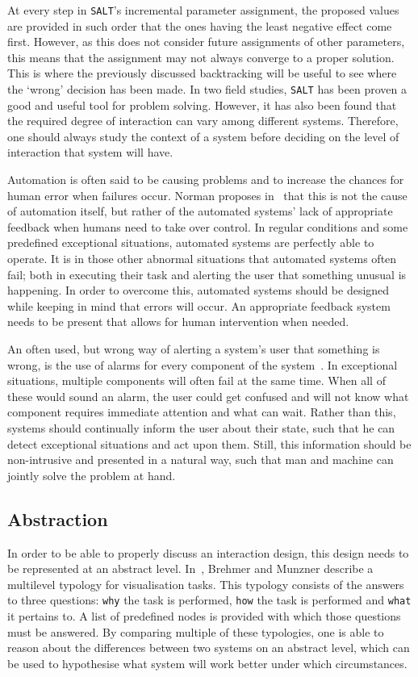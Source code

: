 At every step in \verb|SALT|'s incremental parameter assignment, the proposed values are provided in such order that the ones having the least negative effect come first. However, as this does not consider future assignments of other parameters, this means that the assignment may not always converge to a proper solution. This is where the previously discussed backtracking will be useful to see where the `wrong' decision has been made. In two field studies, \verb|SALT| has been proven a good and useful tool for problem solving. However, it has also been found that the required degree of interaction can vary among different systems. Therefore, one should always study the context of a system before deciding on the level of interaction that system will have.

Automation is often said to be causing problems and to increase the chances for human error when failures occur. Norman proposes in~\cite{norman1990problem} that this is not the cause of automation itself, but rather of the automated systems' lack of appropriate feedback when humans need to take over control. In regular conditions and some predefined exceptional situations, automated systems are perfectly able to operate. It is in those other abnormal situations that automated systems often fail; both in executing their task and alerting the user that something unusual is happening. In order to overcome this, automated systems should be designed while keeping in mind that errors will occur. An appropriate feedback system needs to be present that allows for human intervention when needed.

An often used, but wrong way of alerting a system's user that something is wrong, is the use of alarms for every component of the system~\cite{norman1990problem}. In exceptional situations, multiple components will often fail at the same time. When all of these would sound an alarm, the user could get confused and will not know what component requires immediate attention and what can wait. Rather than this, systems should continually inform the user about their state, such that he can detect exceptional situations and act upon them. Still, this information should be non-intrusive and presented in a natural way, such that man and machine can jointly solve the problem at hand.

\subsection{Abstraction}
In order to be able to properly discuss an interaction design, this design needs to be represented at an abstract level. In~\cite{brehmer2013multi}, Brehmer and Munzner describe a multilevel typology for visualisation tasks. This typology consists of the answers to three questions: \verb|why| the task is performed, \verb|how| the task is performed and \verb|what| it pertains to. A list of predefined nodes is provided with which those questions must be answered. By comparing multiple of these typologies, one is able to reason about the differences between two systems on an abstract level, which can be used to hypothesise what system will work better under which circumstances.


